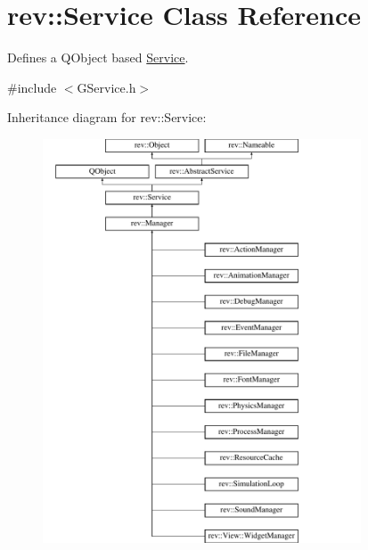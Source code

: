 \hypertarget{classrev_1_1_service}{}\section{rev\+::Service Class Reference}
\label{classrev_1_1_service}


Defines a Q\+Object based \mbox{\hyperlink{classrev_1_1_service}{Service}}.  




{\ttfamily \#include $<$G\+Service.\+h$>$}

Inheritance diagram for rev\+::Service\+:\begin{figure}[H]
\begin{center}
\leavevmode
\includegraphics[height=12.000000cm]{classrev_1_1_service}
\end{center}
\end{figure}
